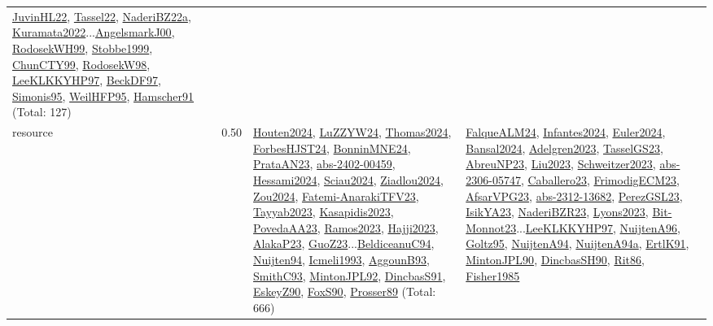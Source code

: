 {\begin{longtable}{p{3cm}r>{\raggedright\arraybackslash}p{6cm}>{\raggedright\arraybackslash}p{6cm}>{\raggedright\arraybackslash}p{8cm}}
\hyperref[detail:JuvinHL22]{JuvinHL22}, \hyperref[detail:Tassel22]{Tassel22}, \hyperref[detail:NaderiBZ22a]{NaderiBZ22a}, \hyperref[detail:Kuramata2022]{Kuramata2022}...\hyperref[detail:AngelsmarkJ00]{AngelsmarkJ00}, \hyperref[detail:RodosekWH99]{RodosekWH99}, \hyperref[detail:Stobbe1999]{Stobbe1999}, \hyperref[detail:ChunCTY99]{ChunCTY99}, \hyperref[detail:RodosekW98]{RodosekW98}, \hyperref[detail:LeeKLKKYHP97]{LeeKLKKYHP97}, \hyperref[detail:BeckDF97]{BeckDF97}, \hyperref[detail:Simonis95]{Simonis95}, \hyperref[detail:WeilHFP95]{WeilHFP95}, \hyperref[detail:Hamscher91]{Hamscher91} (Total: 127)\\
\index{resource}\index{Scheduling!resource}resource &  0.50 & \hyperref[detail:Houten2024]{Houten2024}, \hyperref[detail:LuZZYW24]{LuZZYW24}, \hyperref[detail:Thomas2024]{Thomas2024}, \hyperref[detail:ForbesHJST24]{ForbesHJST24}, \hyperref[detail:BonninMNE24]{BonninMNE24}, \hyperref[detail:PrataAN23]{PrataAN23}, \hyperref[detail:abs-2402-00459]{abs-2402-00459}, \hyperref[detail:Hessami2024]{Hessami2024}, \hyperref[detail:Sciau2024]{Sciau2024}, \hyperref[detail:Ziadlou2024]{Ziadlou2024}, \hyperref[detail:Zou2024]{Zou2024}, \hyperref[detail:Fatemi-AnarakiTFV23]{Fatemi-AnarakiTFV23}, \hyperref[detail:Tayyab2023]{Tayyab2023}, \hyperref[detail:Kasapidis2023]{Kasapidis2023}, \hyperref[detail:PovedaAA23]{PovedaAA23}, \hyperref[detail:Ramos2023]{Ramos2023}, \hyperref[detail:Hajji2023]{Hajji2023}, \hyperref[detail:AlakaP23]{AlakaP23}, \hyperref[detail:GuoZ23]{GuoZ23}...\hyperref[detail:BeldiceanuC94]{BeldiceanuC94}, \hyperref[detail:Nuijten94]{Nuijten94}, \hyperref[detail:Icmeli1993]{Icmeli1993}, \hyperref[detail:AggounB93]{AggounB93}, \hyperref[detail:SmithC93]{SmithC93}, \hyperref[detail:MintonJPL92]{MintonJPL92}, \hyperref[detail:DincbasS91]{DincbasS91}, \hyperref[detail:EskeyZ90]{EskeyZ90}, \hyperref[detail:FoxS90]{FoxS90}, \hyperref[detail:Prosser89]{Prosser89} (Total: 666) & \hyperref[detail:FalqueALM24]{FalqueALM24}, \hyperref[detail:Infantes2024]{Infantes2024}, \hyperref[detail:Euler2024]{Euler2024}, \hyperref[detail:Bansal2024]{Bansal2024}, \hyperref[detail:Adelgren2023]{Adelgren2023}, \hyperref[detail:TasselGS23]{TasselGS23}, \hyperref[detail:AbreuNP23]{AbreuNP23}, \hyperref[detail:Liu2023]{Liu2023}, \hyperref[detail:Schweitzer2023]{Schweitzer2023}, \hyperref[detail:abs-2306-05747]{abs-2306-05747}, \hyperref[detail:Caballero23]{Caballero23}, \hyperref[detail:FrimodigECM23]{FrimodigECM23}, \hyperref[detail:AfsarVPG23]{AfsarVPG23}, \hyperref[detail:abs-2312-13682]{abs-2312-13682}, \hyperref[detail:PerezGSL23]{PerezGSL23}, \hyperref[detail:IsikYA23]{IsikYA23}, \hyperref[detail:NaderiBZR23]{NaderiBZR23}, \hyperref[detail:Lyons2023]{Lyons2023}, \hyperref[detail:Bit-Monnot23]{Bit-Monnot23}...\hyperref[detail:LeeKLKKYHP97]{LeeKLKKYHP97}, \hyperref[detail:NuijtenA96]{NuijtenA96}, \hyperref[detail:Goltz95]{Goltz95}, \hyperref[detail:NuijtenA94]{NuijtenA94}, \hyperref[detail:NuijtenA94a]{NuijtenA94a}, \hyperref[detail:ErtlK91]{ErtlK91}, \hyperref[detail:MintonJPL90]{MintonJPL90}, \hyperref[detail:DincbasSH90]{DincbasSH90}, \hyperref[detail:Rit86]{Rit86}, \hyperref[detail:Fisher1985]{Fisher1985} 
\end{longtable}}

